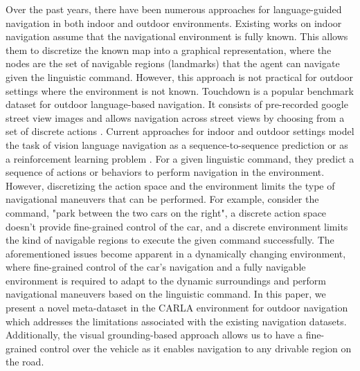 \documentclass[11pt]{article}
\begin{document}
Over the past years, there have been numerous approaches for language-guided navigation in both indoor and outdoor environments. Existing works \cite{anderson2018vision, https://doi.org/10.48550/arxiv.2001.02330, https://doi.org/10.48550/arxiv.1810.00663} on indoor navigation assume that the navigational environment is fully known. This allows them to discretize the known map into a graphical representation, where the nodes are the set of navigable regions (landmarks) that the agent can navigate given the linguistic command. However, this approach is not practical for outdoor settings where the environment is not known. Touchdown \cite{chen2019touchdown} is a popular benchmark dataset for outdoor language-based navigation. It consists of pre-recorded google street view images and allows navigation across street views by choosing from a set of discrete actions \cite{schumann-riezler-2022-analyzing, zhu-etal-2021-multimodal, xiang-etal-2020-learning}. Current approaches for indoor and outdoor settings model the task of vision language navigation as a sequence-to-sequence prediction \cite{sriram2019talk, schumann-riezler-2022-analyzing, zhu-etal-2021-multimodal} or as a reinforcement learning problem \cite{anderson2018vision, fu2019language}. For a given linguistic command, they predict a sequence of actions or behaviors to perform navigation in the environment. However, discretizing the action space and the environment limits the type of navigational maneuvers that can be performed. For example, consider the command, "park between the two cars on the right", a discrete action space doesn't provide fine-grained control of the car, and a discrete environment limits the kind of navigable regions to execute the given command successfully. The aforementioned issues become apparent in a dynamically changing environment, where fine-grained control of the car's navigation and a fully navigable environment is required to adapt to the dynamic surroundings and perform navigational maneuvers based on the linguistic command. In this paper, we present a novel meta-dataset in the CARLA environment for outdoor navigation which addresses the limitations associated with the existing navigation datasets. Additionally, the visual grounding-based approach allows us to have a fine-grained control over the vehicle as it enables navigation to any drivable region on the road.
\end{document}
